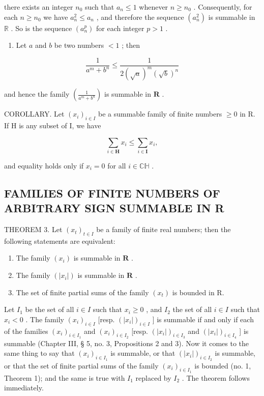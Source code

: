 there exists an integer \(n_0\) such that \(a_n \leqslant 1\) whenever \(n \geqslant n_0\) . Consequently, for each \(n \geqslant n_0\) we have \(a_n^2 \leqslant a_n\) , and therefore the sequence \((a_n^2)\) is summable in \(\mathbb{R}\) . So is the sequence \((a_n^p)\) for each integer \(p > 1\) .

\begin{enumerate}
\def\labelenumi{\arabic{enumi})}
\setcounter{enumi}{2}
\tightlist
\item
  Let \(a\) and \(b\) be two numbers \(< 1\) ; then
\end{enumerate}

\[
\frac {1}{a ^ {m} + b ^ {n}} \leqslant \frac {1}{2 (\sqrt {a}) ^ {m} (\sqrt {b}) ^ {n}}
\]

and hence the family \(\left(\frac{1}{a^m + b^n}\right)\) is summable in \(\mathbf{R}\) .

COROLLARY. Let \((x_{i})_{i\in I}\) be a summable family of finite numbers \(\geqslant 0\) in R. If H is any subset of I, we have

\[
\sum_ {i \in \mathbf {H}} x _ {i} \leqslant \sum_ {i \in \mathbf {I}} x _ {i},
\]

and equality holds only if \(x_{i} = 0\) for all \(i \in \mathbb{C}\mathbb{H}\) .

\subsection{FAMILIES OF FINITE NUMBERS OF ARBITRARY SIGN SUMMABLE IN R}

THEOREM 3. Let \((x_{t})_{t\in I}\) be a family of finite real numbers; then the following statements are equivalent:

\begin{enumerate}
\def\labelenumi{\alph{enumi})}
\item
  The family \((x_{i})\) is summable in \(\mathbf{R}\) .
\item
  The family \((|x_{i}|)\) is summable in \(\mathbf{R}\) .
\item
  The set of finite partial sums of the family \((x_{t})\) is bounded in R.
\end{enumerate}

Let \(I_1\) be the set of all \(i \in I\) such that \(x_i \geq 0\) , and \(I_2\) the set of all \(i \in I\) such that \(x_i < 0\) . The family \((x_i)_{i \in I}\) {[}resp. \((|x_i|)_{i \in I}\) {]} is summable if and only if each of the families \((x_i)_{i \in I_1}\) and \((x_i)_{i \in I_2}\) {[}resp. \((|x_i|)_{i \in I_3}\) and \((|x_i|)_{i \in I_4}\) {]} is summable (Chapter III, § 5, no. 3, Propositions 2 and 3). Now it comes to the same thing to say that \((x_i)_{i \in I_1}\) is summable, or that \((|x_i|)_{i \in I_2}\) is summable, or that the set of finite partial sums of the family \((x_{i})_{i\in I_1}\) is bounded (no. 1, Theorem 1); and the same is true with \(I_1\) replaced by \(I_2\) . The theorem follows immediately.

